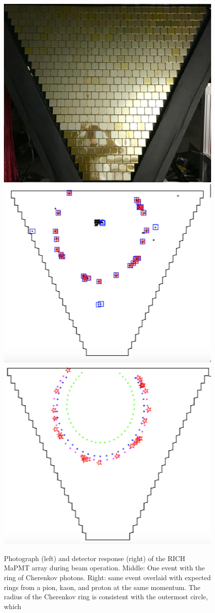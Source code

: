 \documentclass[final,3p]{elsarticle}
\begin{document}
\begin{twocolumn}
\begin{figure}[ht!]
\centerline{\includegraphics[width=0.625\columnwidth]{rich1.png} 
\includegraphics[width=0.65\columnwidth]{rich2.png}
\includegraphics[width=0.64\columnwidth]{rich3.png} }
\caption{Photograph (left) and detector response (right) of the RICH MaPMT array during beam operation. Middle:
  One event with the ring of Cherenkov photons. Right: same event overlaid with expected rings from a pion, kaon, and
  proton at the same momentum. The radius of the Cherenkov ring is consistent with the outermost circle, which
}
\end{figure}
\end{twocolumn}
\end{document}
